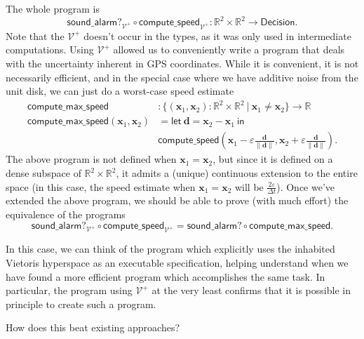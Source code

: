 \documentclass{article}           %
\newcommand{\R}{\mathbb{R}}
\newcommand{\suchthat}{\ |\ }
\newcommand{\Viet}{{\mathcal{V}^+}}
\newcommand{\ve}[1]{\mathbf{#1}}
\begin{document}
The whole program is 
\[
\mathsf{sound\_alarm?}_\Viet \circ \mathsf{compute\_speed}_\Viet : \R^2 \times \R^2 \to \mathsf{Decision}.
\]
Note that the $\Viet$ doesn't occur in the types, as it was only used in intermediate computations. Using $\Viet$ allowed us to conveniently write a program that deals with the uncertainty inherent in GPS coordinates. While it is convenient, it is not necessarily efficient, and in the special case where we have additive noise from the unit disk, we can just do a worst-case speed estimate
\begin{align*}
\mathsf{compute\_max\_speed} &: \{ (\ve{x}_1, \ve{x}_2) : \R^2 \times \R^2 \suchthat \ve{x}_1 \ne \ve{x}_2 \} \to \R
\\ \mathsf{compute\_max\_speed} (\ve{x}_1, \ve{x}_2) &= 
\mathsf{let}\ \ve{d} = \ve{x}_2 - \ve{x}_1\ \mathsf{in}\ 
\\
&\mathsf{compute\_speed}\left( 
\ve{x}_1 - \varepsilon \frac{\ve{d}}{\| \ve{d} \|}, \ve{x}_2 + \varepsilon \frac{\ve{d}}{\| \ve{d} \|}
\right).
\end{align*}
The above program is not defined when $\ve{x}_1 = \ve{x}_2$, but since it is defined on a dense subspace of $\R^2 \times \R^2$, it admits a (unique) continuous extension to the entire space (in this case, the speed estimate when $\ve{x}_1 = \ve{x}_2$ will be $\frac{2\varepsilon}{\Delta t}$).
Once we've extended the above program, we should be able to prove (with much effort) the equivalence of the programs
\[
\mathsf{sound\_alarm?}_\Viet \circ \mathsf{compute\_speed}_\Viet
=
\mathsf{sound\_alarm?} \circ \mathsf{compute\_max\_speed}.
\]

In this case, we can think of the program which explicitly uses the inhabited Vietoris hyperspace as an executable specification, helping understand when we have found a more efficient program which accomplishes the same task. In particular, the program using $\Viet$ at the very least confirms that it is possible in principle to create such a program.

How does this beat existing approaches?
\end{document}
